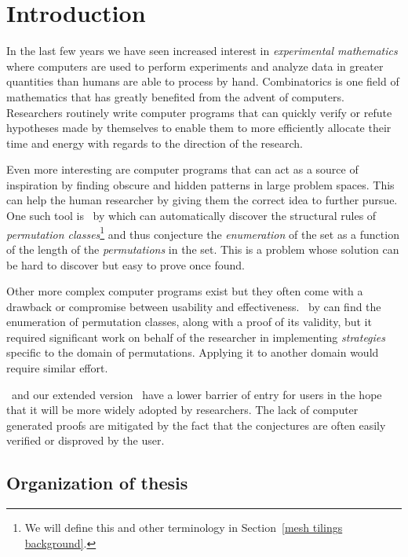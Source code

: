 \chapter{Introduction\label{cha:introduction}}

In the last few years we have seen increased interest in \emph{experimental 
mathematics} where computers are used to perform experiments and analyze data 
in greater quantities than humans are able to process by hand. Combinatorics is 
one field of mathematics that has greatly benefited from the advent of 
computers. Researchers routinely write computer programs that can quickly 
verify or refute hypotheses made by themselves to enable them to more
efficiently allocate their time and energy with regards to the direction of the 
research. 

Even more interesting are computer programs that can act as a source of
inspiration by finding obscure and hidden patterns in large problem spaces. 
This can help the human researcher by giving them the correct idea to further
pursue. One such tool is \Struct\ by \textcite{bean_automatic_2019} which can
automatically discover the structural rules of \emph{permutation 
classes}\footnote{We will define this and other terminology in 
Section~\ref{mesh tilings background}.} and thus conjecture the 
\emph{enumeration} of the set as a function of the length of the 
\emph{permutations} in the set. This is a problem whose solution can be hard to 
discover but easy to prove once found.

Other more complex computer programs exist but they often come with a drawback 
or compromise between usability and effectiveness. \CombSpecSearcher\ by 
\textcite{bean_finding_2018} can find the enumeration of permutation classes, 
along with a proof of its validity, but it required significant work on 
behalf of the researcher in implementing \emph{strategies} specific to the 
domain of permutations. Applying it to another domain would require similar
effort.  

\Struct\ and our extended version \CombCov\ have a lower barrier of entry for 
users in the hope that it will be more widely adopted by researchers. The lack 
of computer generated proofs are mitigated by the fact that the conjectures are 
often easily verified or disproved by the user.


\section{Organization of thesis}

